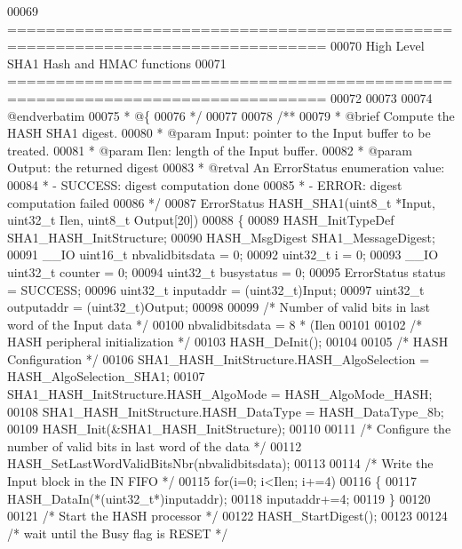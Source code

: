 \begin{DoxyCode}
00069 \textcolor{comment}{ ===============================================================================}
00070 \textcolor{comment}{                          High Level SHA1 Hash and HMAC functions}
00071 \textcolor{comment}{ ===============================================================================}
00072 \textcolor{comment}{}
00073 \textcolor{comment}{}
00074 \textcolor{comment}{@endverbatim}
00075 \textcolor{comment}{  * @\{}
00076 \textcolor{comment}{  */}
00077 
00078 \textcolor{comment}{/**}
00079 \textcolor{comment}{  * @brief  Compute the HASH SHA1 digest.}
00080 \textcolor{comment}{  * @param  Input: pointer to the Input buffer to be treated.}
00081 \textcolor{comment}{  * @param  Ilen: length of the Input buffer.}
00082 \textcolor{comment}{  * @param  Output: the returned digest}
00083 \textcolor{comment}{  * @retval An ErrorStatus enumeration value:}
00084 \textcolor{comment}{  *          - SUCCESS: digest computation done}
00085 \textcolor{comment}{  *          - ERROR: digest computation failed}
00086 \textcolor{comment}{  */}
00087 ErrorStatus HASH_SHA1(uint8\_t *Input, uint32\_t Ilen, uint8\_t Output[20])
00088 \{
00089   HASH\_InitTypeDef SHA1\_HASH\_InitStructure;
00090   HASH\_MsgDigest SHA1\_MessageDigest;
00091   \_\_IO uint16\_t nbvalidbitsdata = 0;
00092   uint32\_t i = 0;
00093   \_\_IO uint32\_t counter = 0;
00094   uint32\_t busystatus = 0;
00095   ErrorStatus status = SUCCESS;
00096   uint32\_t inputaddr  = (uint32\_t)Input;
00097   uint32\_t outputaddr = (uint32\_t)Output;
00098 
00099   \textcolor{comment}{/* Number of valid bits in last word of the Input data */}
00100   nbvalidbitsdata = 8 * (Ilen %
00101 
00102   \textcolor{comment}{/* HASH peripheral initialization */}
00103   HASH_DeInit();
00104 
00105   \textcolor{comment}{/* HASH Configuration */}
00106   SHA1\_HASH\_InitStructure.HASH\_AlgoSelection = HASH_AlgoSelection_SHA1;
00107   SHA1\_HASH\_InitStructure.HASH\_AlgoMode = HASH_AlgoMode_HASH;
00108   SHA1\_HASH\_InitStructure.HASH\_DataType = HASH_DataType_8b;
00109   HASH_Init(&SHA1\_HASH\_InitStructure);
00110 
00111   \textcolor{comment}{/* Configure the number of valid bits in last word of the data */}
00112   HASH\_SetLastWordValidBitsNbr(nbvalidbitsdata);
00113 
00114   \textcolor{comment}{/* Write the Input block in the IN FIFO */}
00115   \textcolor{keywordflow}{for}(i=0; i<Ilen; i+=4)
00116   \{
00117     HASH\_DataIn(*(uint32\_t*)inputaddr);
00118     inputaddr+=4;
00119   \}
00120 
00121   \textcolor{comment}{/* Start the HASH processor */}
00122   HASH_StartDigest();
00123 
00124   \textcolor{comment}{/* wait until the Busy flag is RESET */}

\end{DoxyCode}
